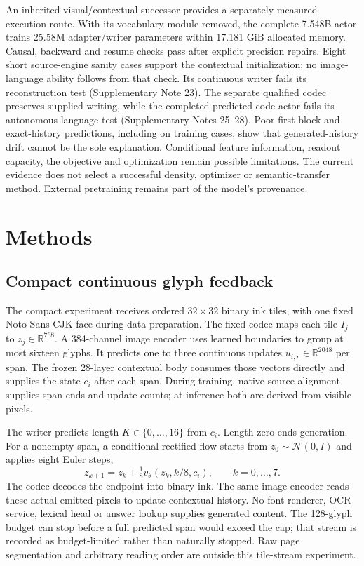 \documentclass[12pt,a4paper]{article}
\begin{document}
An inherited visual/contextual successor provides a separately measured
execution route. With its vocabulary module removed, the complete 7.548B
actor trains 25.58M adapter/writer parameters within 17.181 GiB allocated
memory. Causal, backward and resume checks pass after explicit precision
repairs. Eight short source-engine sanity cases support the contextual
initialization; no image-language ability follows from that check. Its
continuous writer fails its reconstruction test (Supplementary Note 23).
The separate qualified codec preserves supplied writing, while the completed
predicted-code actor fails its autonomous language test
(Supplementary Notes 25--28).
Poor first-block and exact-history predictions, including on training cases,
show that generated-history drift cannot be the sole explanation.
Conditional feature information, readout capacity, the objective and
optimization remain possible limitations. The current evidence does not
select a successful density, optimizer or semantic-transfer method.
External pretraining remains part of the model's provenance.

\section*{Methods}
\subsection*{Compact continuous glyph feedback}
The compact experiment receives ordered $32\times32$ binary ink tiles, with
one fixed Noto Sans CJK face during data preparation. The fixed codec maps
each tile $I_j$ to $z_j\in\mathbb R^{768}$. A 384-channel image encoder uses
learned boundaries to group at most sixteen glyphs. It predicts one to three
continuous updates $u_{i,r}\in\mathbb R^{2048}$ per span. The frozen 28-layer
contextual body consumes those vectors directly and supplies the state $c_i$
after each span. During training, native source alignment supplies span ends
and update counts; at inference both are derived from visible pixels.

The writer predicts length $K\in\{0,\ldots,16\}$ from $c_i$. Length zero ends
generation. For a nonempty span, a conditional rectified flow starts from
$z_0\sim\mathcal N(0,I)$ and applies eight Euler steps,
\begin{equation}
 z_{k+1}=z_k+\tfrac18 v_\theta(z_k,k/8,c_i),\qquad k=0,\ldots,7.
\end{equation}
The codec decodes the endpoint into binary ink. The same image encoder reads
these actual emitted pixels to update contextual history. No font renderer,
OCR service, lexical head or answer lookup supplies generated content. The
128-glyph budget can stop before a full predicted span would exceed the cap;
that stream is recorded as budget-limited rather than naturally stopped.
Raw page segmentation and arbitrary reading order are outside this tile-stream
experiment.
\end{document}

